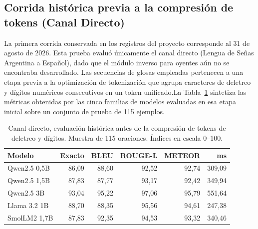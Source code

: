 \subsection{Corrida histórica previa a la compresión de tokens (Canal Directo)}
La primera corrida conservada en los registros del proyecto corresponde al 31 de agosto de 2026. Esta prueba evaluó únicamente el canal directo (Lengua de Señas Argentina a Español), dado que el módulo inverso para oyentes aún no se encontraba desarrollado. Las secuencias de glosas empleadas pertenecen a una etapa previa a la optimización de tokenización que agrupa caracteres de deletreo y dígitos numéricos consecutivos en un token unificado.La Tabla~\ref{tab:sem_previo} sintetiza las métricas obtenidas por las cinco familias de modelos evaluadas en esa etapa inicial sobre un conjunto de prueba de 115 ejemplos.

\begin{table}[H]
\centering
\small
\caption{Canal directo, evaluación histórica antes de la compresión de tokens de deletreo y dígitos. Muestra de 115 oraciones. Índices en escala 0--100.}
\label{tab:sem_previo}
\begin{tabular}{lrrrrr}
\toprule
\textbf{Modelo} & \textbf{Exacto} & \textbf{BLEU} & \textbf{ROUGE-L} & \textbf{METEOR} & \textbf{ms} \\
\midrule
Qwen2.5 0,5B & 86{,}09 & 88{,}60 & 92{,}52 & 92{,}74 & 309,09 \\
Qwen2.5 1,5B & 87{,}83 & 87{,}77 & 93{,}17 & 92{,}42 & 349,94 \\
Qwen2.5 3B   & 93{,}04 & 95{,}22 & 97{,}06 & 95{,}79 & 551{,}64 \\
Llama 3.2 1B & 88{,}70 & 88{,}35 & 95{,}56 & 94{,}61 & 247{,}38 \\
SmolLM2 1,7B & 87{,}83 & 92{,}35 & 94{,}53 & 93{,}32 & 340{,}46 \\
\bottomrule
\end{tabular}
\end{table}

